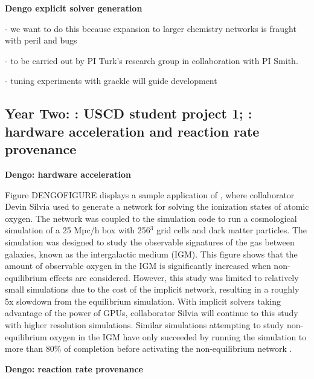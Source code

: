 \noindent \textbf{Dengo explicit solver generation}

- we want to do this because expansion to larger chemistry networks is
fraught with peril and bugs

- to be carried out by PI Turk's research group in collaboration with
PI Smith.

- tuning experiments with grackle will guide development

\subsection{Year Two: \grackle{}: USCD student project 1; \dengo{}:
  hardware acceleration and reaction rate provenance}

\noindent \textbf{Dengo: hardware acceleration}

Figure DENGOFIGURE displays a sample application of \dengo{}, where
collaborator Devin Silvia used \dengo{} to generate a network for solving
the ionization states of atomic oxygen.  The network was coupled to
the \enzo{} simulation code to run a cosmological simulation of a 25
Mpc/h box with 256$^{3}$ grid cells and dark matter particles.  The
simulation was designed to study the observable signatures of the gas
between galaxies, known as the intergalactic medium (IGM).  This
figure shows that the amount of observable oxygen in the IGM is
significantly increased when non-equilibrium effects are considered.
However, this study was limited to relatively small simulations due to
the cost of the implicit network, resulting in a roughly 5x slowdown
from the equilibrium simulation.  With  implicit solvers
taking advantage of the power of GPUs, collaborator Silvia will
continue to this study with higher resolution simulations.  Similar
simulations attempting to study non-equilibrium oxygen in the IGM have
only succeeded by running the simulation to more than 80\% of
completion before activating the non-equilibrium network
\citep{2016MNRAS.460.2157O}.

\noindent \textbf{Dengo: reaction rate provenance}

